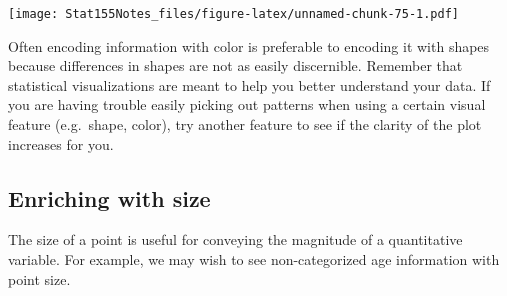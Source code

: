 \documentclass[]{book}
\newenvironment{Shaded}{\begin{snugshade}}{\end{snugshade}}
\newcommand{\CommentTok}[1]{\textcolor[rgb]{0.56,0.35,0.01}{\textit{#1}}}
\newcommand{\DataTypeTok}[1]{\textcolor[rgb]{0.13,0.29,0.53}{#1}}
\newcommand{\FloatTok}[1]{\textcolor[rgb]{0.00,0.00,0.81}{#1}}
\newcommand{\KeywordTok}[1]{\textcolor[rgb]{0.13,0.29,0.53}{\textbf{#1}}}
\newcommand{\NormalTok}[1]{#1}
\newcommand{\OperatorTok}[1]{\textcolor[rgb]{0.81,0.36,0.00}{\textbf{#1}}}
\newcommand{\StringTok}[1]{\textcolor[rgb]{0.31,0.60,0.02}{#1}}
\begin{document}
\begin{Shaded}
\end{Shaded}

\texttt{[image: Stat155Notes\_files/figure-latex/unnamed-chunk-75-1.pdf]}

Often encoding information with color is preferable to encoding it with shapes because differences in shapes are not as easily discernible. Remember that statistical visualizations are meant to help you better understand your data. If you are having trouble easily picking out patterns when using a certain visual feature (e.g.~shape, color), try another feature to see if the clarity of the plot increases for you.

\hypertarget{enriching-with-size}{%
\subsection{Enriching with size}\label{enriching-with-size}}

The size of a point is useful for conveying the magnitude of a quantitative variable. For example, we may wish to see non-categorized age information with point size.

\begin{Shaded}
\end{Shaded}
\end{document}
